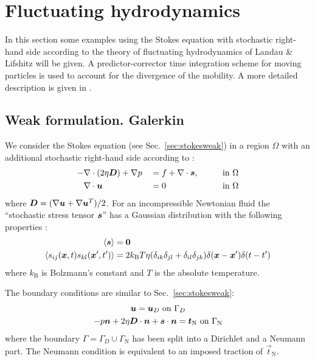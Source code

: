 
\def\headdate{11th May 2016}

\section{Fluctuating hydrodynamics}
\label{sec:brownian}

In this section some examples using the Stokes equation with stochastic
right-hand side according to the theory of fluctuating hydrodynamics of Landau
\& Lifshitz \cite{Landau59} will be given. A predictor-corrector time integration scheme 
for moving particles is used to account for the divergence
of the mobility. 
A more detailed description is given in \cite{DeCorato2016}.

\subsection{Weak formulation. Galerkin}

We consider the Stokes equation (see Sec.~\ref{sec:stokesweak})
in a region $\Omega$ with an additional stochastic right-hand side according to
\cite{Landau59}:
\begin{alignat}{3}
 -&\nabla\cdot(2\eta \boldsymbol{D})+\nabla p & &=f+\nabla\cdot\boldsymbol{s},
                              &&\qquad\text{in }\Omega
     \label{eq:stokes1s}\\
   &\nabla\cdot\boldsymbol{u}& &=0&&\qquad\text{in }\Omega
     \label{eq:stokes2s}
\end{alignat}
where $\boldsymbol{D}=(\nabla\boldsymbol{u}+\nabla\boldsymbol{u}^T)/2$.
For an incompressible Newtonian fluid 
the ``stochastic stress tensor $\boldsymbol{s}$'' has a Gaussian distribution with the
following properties \cite{Landau59,Sengers06}:
\begin{align}
   \langle \boldsymbol{s} \rangle &= \boldsymbol{0} \\
    \langle s_{ij}(\boldsymbol{x},t)s_{kl}(\boldsymbol{x}',t')\rangle &=
     2k_\text{B}T\eta(\delta_{ik}\delta_{jl}    +
                      \delta_{il}\delta_{jk})
         \delta(\boldsymbol{x}-\boldsymbol{x}')\delta(t-t')    
\end{align}
where $k_\text{B}$ is Bolzmann's constant and $T$ is the absolute temperature.

The boundary conditions are similar to Sec.~\ref{sec:stokesweak}:
\begin{gather}
    \boldsymbol{u} = \boldsymbol{u}_D\text{ on }\Gamma_D\\
    -p\boldsymbol{n}+2\eta \boldsymbol{D}\cdot\boldsymbol{n}+\boldsymbol{s}\cdot\boldsymbol{n}
          =\boldsymbol{t}_{\text{N}}\text{ on }\Gamma_{\text{N}}
\end{gather}
where the boundary $\Gamma=\Gamma_D\cup\Gamma_{\text{N}}$ has been split into a
Dirichlet and a Neumann part. The Neumann condition is equivalent
to an imposed traction of $\vec t_{\text{N}}$. 

